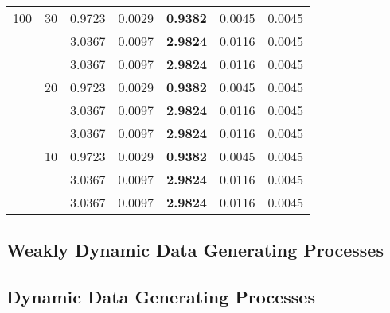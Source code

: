 \begin{table}[H]
{\begin{tabular}{c c | C{2.4cm} | C{2.4cm} | C{2.4cm} | C{2.4cm} | C{2.4cm} }
			\cmidrule(lr){1-7}
			100&30&0.9723&0.0029&\textbf{0.9382}&0.0045&0.0045\\
			&&3.0367&0.0097&\textbf{2.9824}&0.0116&0.0045\\
			&&3.0367&0.0097&\textbf{2.9824}&0.0116&0.0045\\
			&20&0.9723&0.0029&\textbf{0.9382}&0.0045&0.0045\\
			&&3.0367&0.0097&\textbf{2.9824}&0.0116&0.0045\\
			&&3.0367&0.0097&\textbf{2.9824}&0.0116&0.0045\\
			&10&0.9723&0.0029&\textbf{0.9382}&0.0045&0.0045\\
			&&3.0367&0.0097&\textbf{2.9824}&0.0116&0.0045\\
			&&3.0367&0.0097&\textbf{2.9824}&0.0116&0.0045\\
			\bottomrule[1.5pt]
	\end{tabular}}
	\label{table:table S.6}
\end{table}

\subsection{Weakly Dynamic Data Generating Processes}
\subsection{Dynamic Data Generating Processes}